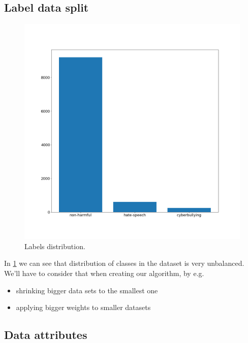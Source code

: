 \documentclass[a4paper]{article}
\begin{document}
\subsection{Label data split}
\begin{figure}[h]
\centering
\includegraphics[width=\textwidth]{plots/tags_bar_plot.png}
\caption{Labels distribution.}
\label{fig:labels_distribution}
\end{figure}

In \ref{fig:labels_distribution} we can see that distribution of classes in the dataset is very unbalanced. We'll have to consider that when creating our algorithm, by e.g.
\begin{itemize}
    \item shrinking bigger data sets to the smallest one
    \item applying bigger weights to smaller datasets
\end{itemize}


\newpage
\subsection{Data attributes}
\end{document}
